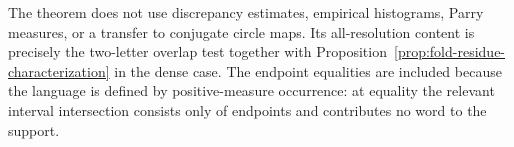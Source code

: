\begin{remark}[Scope]\label{rem:scope}
The theorem does not use discrepancy estimates, empirical histograms,
Parry measures, or a transfer to conjugate circle maps.  Its
all-resolution content is precisely the two-letter overlap test together
with Proposition~\ref{prop:fold-residue-characterization} in the dense
case.  The endpoint equalities are included because the language is defined
by positive-measure occurrence: at equality the relevant interval
intersection consists only of endpoints and contributes no word to the
support.
\end{remark}
